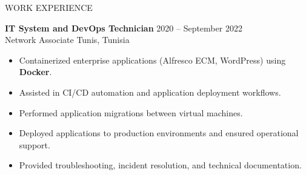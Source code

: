 \documentclass{resume}
\begin{document}
\begin{rSection}{WORK EXPERIENCE}
\vspace{0.4em}

\textbf{IT System and DevOps Technician} \hfill 2020 -- September 2022 \\
Network Associate \hfill Tunis, Tunisia \\

\begin{itemize}
\itemsep -3pt
\item Containerized enterprise applications (Alfresco ECM, WordPress) using \textbf{Docker}.
\item Assisted in CI/CD automation and application deployment workflows.
\item Performed application migrations between virtual machines.
\item Deployed applications to production environments and ensured operational support.
\item Provided troubleshooting, incident resolution, and technical documentation.
\end{itemize}

\end{rSection}
\end{document}
